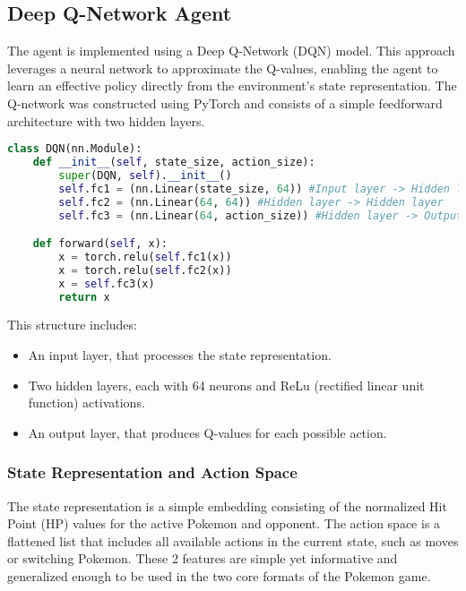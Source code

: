 \subsection{Deep Q-Network Agent}
The agent is implemented using a Deep Q-Network (DQN) model. This approach leverages
a neural network to approximate the Q-values, enabling the agent to learn an 
effective policy directly from the environment's state representation. 
The Q-network was constructed using PyTorch and consists of a simple feedforward
architecture with two hidden layers. 
\begin{lstlisting}[basicstyle=\fontsize{10}{10}\selectfont\ttfamily,language=Python,caption={The defined action space.},label=lst:action-space-def,breaklines]
class DQN(nn.Module):
    def __init__(self, state_size, action_size):
        super(DQN, self).__init__()
        self.fc1 = (nn.Linear(state_size, 64)) #Input layer -> Hidden layer
        self.fc2 = (nn.Linear(64, 64)) #Hidden layer -> Hidden layer
        self.fc3 = (nn.Linear(64, action_size)) #Hidden layer -> Output layer

    def forward(self, x):
        x = torch.relu(self.fc1(x))
        x = torch.relu(self.fc2(x))
        x = self.fc3(x)
        return x 
\end{lstlisting}
This structure includes:
\begin{itemize}
    \item An input layer, that processes the state representation.
    \item Two hidden layers, each with 64 neurons and ReLu (rectified linear unit function) activations.
    \item An output layer, that produces Q-values for each possible action.
\end{itemize}

\subsubsection{State Representation and Action Space}
The state representation is a simple embedding consisting of the normalized Hit Point (HP) values
for the active Pokemon and opponent. The action space is a flattened list that
includes all available actions in the current state, such as moves or switching Pokemon. 
These 2 features are simple yet informative and generalized 
enough to be used in the two core formats of the Pokemon game.

